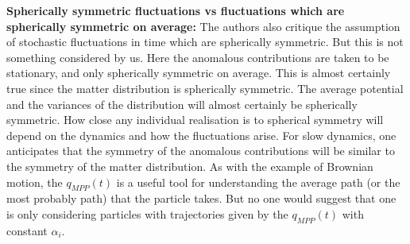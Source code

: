 \documentclass[aps,pra,amsmath,amssymb,amsthm,floatfix,nofootinbib,notitlepage,superscriptaddress,10pt]{revtex4-2}
\begin{document}
{\bf\noindent Spherically symmetric fluctuations vs fluctuations which are spherically symmetric on average:} The authors also critique the assumption of stochastic fluctuations in time which are spherically symmetric. But this is not something considered by us. Here the anomalous contributions are taken to be stationary, and only spherically symmetric on average.  This is almost certainly true since the matter distribution is spherically symmetric. The average potential and the variances of the distribution will almost certainly be spherically symmetric. How close any individual realisation is to spherical symmetry will depend on the dynamics and how the fluctuations arise. For slow dynamics, one anticipates that the symmetry of the anomalous contributions will be similar to the symmetry of the matter distribution. As with the example of Brownian motion, the  $q_{MPP}(t)$ is a useful tool for understanding the average path (or the most probably path) that the particle takes. But no one would suggest that one is only considering particles with trajectories given by the $q_{MPP}(t)$ with constant $\alpha_i$.
\end{document}
